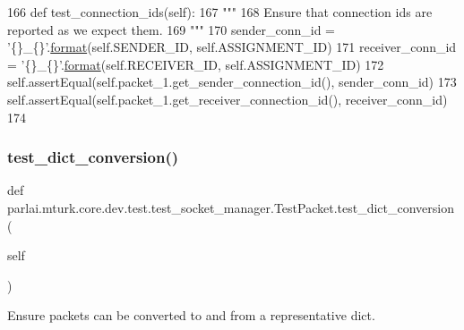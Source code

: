 \begin{DoxyCode}
166     \textcolor{keyword}{def }test\_connection\_ids(self):
167         \textcolor{stringliteral}{"""}
168 \textcolor{stringliteral}{        Ensure that connection ids are reported as we expect them.}
169 \textcolor{stringliteral}{        """}
170         sender\_conn\_id = \textcolor{stringliteral}{'\{\}\_\{\}'}.\hyperlink{namespaceparlai_1_1chat__service_1_1services_1_1messenger_1_1shared__utils_a32e2e2022b824fbaf80c747160b52a76}{format}(self.SENDER\_ID, self.ASSIGNMENT\_ID)
171         receiver\_conn\_id = \textcolor{stringliteral}{'\{\}\_\{\}'}.\hyperlink{namespaceparlai_1_1chat__service_1_1services_1_1messenger_1_1shared__utils_a32e2e2022b824fbaf80c747160b52a76}{format}(self.RECEIVER\_ID, self.ASSIGNMENT\_ID)
172         self.assertEqual(self.packet\_1.get\_sender\_connection\_id(), sender\_conn\_id)
173         self.assertEqual(self.packet\_1.get\_receiver\_connection\_id(), receiver\_conn\_id)
174 
\end{DoxyCode}
\mbox{\label{classparlai_1_1mturk_1_1core_1_1dev_1_1test_1_1test__socket__manager_1_1TestPacket_abeff58f91dd840246dff799eb2324f97}} 
\subsubsection{\texorpdfstring{test\+\_\+dict\+\_\+conversion()}{test\_dict\_conversion()}}
{\footnotesize\ttfamily def parlai.\+mturk.\+core.\+dev.\+test.\+test\+\_\+socket\+\_\+manager.\+Test\+Packet.\+test\+\_\+dict\+\_\+conversion (\begin{DoxyParamCaption}\item[{}]{self }\end{DoxyParamCaption})}

\begin{DoxyVerb}Ensure packets can be converted to and from a representative dict.
\end{DoxyVerb}
 

